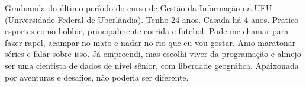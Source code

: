 
\begin{cvparagraph}

    Graduanda do último período do curso de Gestão da Informação na UFU (Universidade Federal de Uberlândia). Tenho 24 anos. Casada há 4 anos. Pratico esportes como hobbie, principalmente corrida e futebol. Pode me chamar para fazer rapel, acampar no mato e nadar no rio que eu vou gostar. Amo maratonar séries e falar sobre isso. Já empreendi, mas escolhi viver da programação e almejo ser uma cientista de dados de nível sênior, com liberdade geográfica. Apaixonada por aventuras e desafios, não poderia ser diferente.

\end{cvparagraph}
